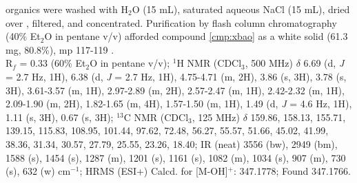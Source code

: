 organics were washed with H$_2$O (15 mL), saturated aqueous NaCl (15 mL), dried over ,
filtered, and concentrated. Purification by flash column chromatography (40\% Et$_2$O in pentane
v/v) afforded compound \ref{cmp:xbao} as a white solid (61.3 mg, 80.8\%), mp 117-119 \degc.\\
R$_f$ = 0.33 (60\% Et$_2$O in pentane v/v); $^1$H NMR (CDCl$_3$, 500 MHz) $\delta$ 6.69 (d, \textit{J} = 2.7 Hz, 1H), 6.38
(d, \textit{J} = 2.7 Hz, 1H), 4.75-4.71 (m, 2H), 3.86 (s, 3H), 3.78 (s, 3H), 3.61-3.57 (m, 1H), 2.97-2.89
(m, 2H), 2.57-2.47 (m, 1H), 2.42-2.32 (m, 1H), 2.09-1.90 (m, 2H), 1.82-1.65 (m, 4H), 1.57-1.50
(m, 1H), 1.49 (d, \textit{J} = 4.6 Hz, 1H), 1.11 (s, 3H), 0.67 (s, 3H); $^{13}$C NMR (CDCl$_3$, 125
MHz) $\delta$ 159.86, 158.13, 155.71, 139.15, 115.83, 108.95, 101.44, 97.62, 72.48, 56.27, 55.57,
51.66, 45.02, 41.99, 38.36, 31.34, 30.57, 27.79, 25.55, 23.26, 18.40; IR (neat) 3556 (bw), 2949
(bm), 1588 (s), 1454 (s), 1287 (m), 1201 (s), 1161 (s), 1082 (m), 1034 (s), 907 (m), 730 (s), 632
(w) cm$^{-1}$; HRMS (ESI+) Calcd. for  [M-OH]$^+$: 347.1778; Found 347.1766.

